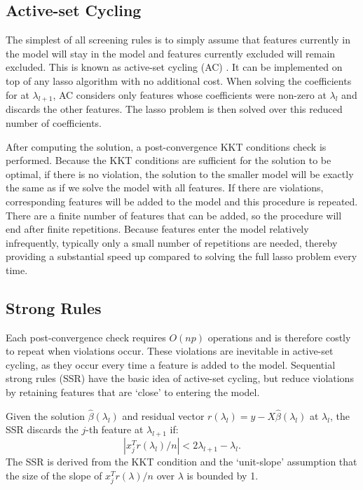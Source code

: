 \documentclass[]{interact}
\theoremstyle{plain}%
\theoremstyle{definition}
\theoremstyle{remark}
\newcommand{\quotes}[1]{`#1'}
\begin{document}
\subsection{Active-set Cycling}
\label{sec:active}

The simplest of all screening rules is to simply assume that features currently in the model will stay in the model and features currently excluded will remain excluded.  This is known as active-set cycling (AC) \citep{lee2007efficient}. It can be implemented on top of any lasso algorithm with no additional cost. When solving the coefficients for at $\lambda_{l+1}$, AC considers only features whose coefficients were non-zero at $\lambda_l$ and discards the other features. The lasso problem is then solved over this reduced number of coefficients.

After computing the solution, a post-convergence KKT conditions check is performed. Because the KKT conditions are sufficient for the solution to be optimal, if there is no violation, the solution to the smaller model will be exactly the same as if we solve the model with all features. If there are violations, corresponding features will be added to the model and this procedure is repeated. There are a finite number of features that can be added, so the procedure will end after finite repetitions. Because features enter the model relatively infrequently, typically only a small number of repetitions are needed, thereby providing a substantial speed up compared to solving the full lasso problem every time.

\subsection{Strong Rules}

Each post-convergence check requires $O(np)$ operations and is therefore costly to repeat when violations occur.  These violations are inevitable in active-set cycling, as they occur every time a feature is added to the model.  Sequential strong rules (SSR) \citep{Tibshirani2012} have the basic idea of active-set cycling, but reduce violations by retaining features that are \quotes{close} to entering the model.

Given the solution $\hat{\beta}(\lambda_l)$ and residual vector $r(\lambda_l)=y-X\hat{\beta}(\lambda_l)$ at $\lambda_l$, the SSR discards the $j$-th feature at $\lambda_{l+1}$ if:
\begin{equation}
  \label{eq:ssr}
  |x_j^Tr(\lambda_l)/n|<2\lambda_{l+1}-\lambda_l.
\end{equation}
The SSR is derived from the KKT condition and the \quotes{unit-slope} assumption that the size of the slope of $x_j^Tr(\lambda)/n$ over $\lambda$ is bounded by 1. 
\end{document}
